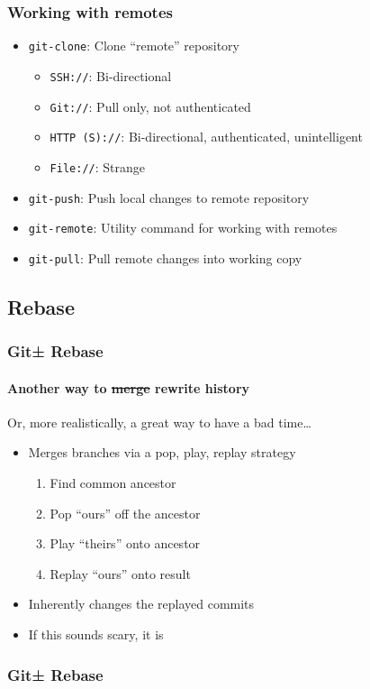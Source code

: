 \documentclass{beamer}
\begin{document}
\begin{frame}
\frametitle{Working with remotes}
\begin{itemize}
\item{\texttt{git-clone}: Clone ``remote'' repository}
\begin{itemize}
\item{\texttt{SSH://}: Bi-directional}
\item{\texttt{Git://}: Pull only, not authenticated}
\item{\texttt{HTTP (S)://}: Bi-directional, authenticated, unintelligent}
\item{\texttt{File://}: Strange}
\end{itemize}
\item{\texttt{git-push}: Push local changes to remote repository}
\item{\texttt{git-remote}: Utility command for working with remotes}
\item{\texttt{git-pull}: Pull remote changes into working copy}
\end{itemize}
\end{frame}

\subsection{Rebase}
\begin{frame}
\frametitle{Git± Rebase}
\framesubtitle{Another way to \sout{merge} rewrite history}
Or, more realistically, a great way to have a bad time\ldots{}
\begin{itemize}
\item{Merges branches via a pop, play, replay strategy}
\begin{enumerate}
\item{Find common ancestor}
\item{Pop ``ours'' off the ancestor}
\item{Play ``theirs'' onto ancestor}
\item{Replay ``ours'' onto result}
\end{enumerate}
\item{Inherently changes the replayed commits}
\item{If this sounds scary, it is}
\end{itemize}
\end{frame}

\begin{frame}
\frametitle{Git± Rebase}
\begin{figure}
\end{figure}
\end{frame}
\end{document}
